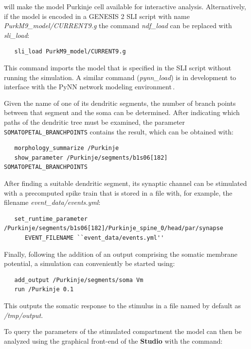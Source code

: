 \documentclass[12pt]{article}
\begin{document}
will make the model Purkinje cell available for interactive analysis.
Alternatively, if the model is encoded in a GENESIS 2 SLI script with
name {\it PurkM9\_model/CURRENT9.g} the command {\it ndf\_load} can be
replaced with {\it sli\_load}:

{\footnotesize
\begin{verbatim}
   sli_load PurkM9_model/CURRENT9.g
\end{verbatim}
}

This command imports the model that is specified in the SLI script
without running the simulation.  A similar command ({\it pynn\_load})
is in development to interface with the PyNN network modeling
environment\,\cite{andrew08:_pynn}.

Given the name of one of its dendritic segments, the number of branch
points between that segment and the soma can be determined. After
indicating which paths of the dendritic tree must be examined, the
parameter {\tt SOMATOPETAL\_BRANCHPOINTS} contains the result, which
can be obtained with:

{\footnotesize
\begin{verbatim}
   morphology_summarize /Purkinje
   show_parameter /Purkinje/segments/b1s06[182] SOMATOPETAL_BRANCHPOINTS
\end{verbatim}
}

After finding a suitable dendritic segment, its synaptic channel can
be stimulated with a precomputed spike train that is stored in a file
with, for example, the filename {\it event\_data/events.yml}:

{\footnotesize
\begin{verbatim}
   set_runtime_parameter /Purkinje/segments/b1s06[182]/Purkinje_spine_0/head/par/synapse
      EVENT_FILENAME ``event_data/events.yml''
\end{verbatim}
}

Finally, following the addition of an output comprising the somatic membrane potential, a simulation can conveniently be started using:

{\footnotesize
\begin{verbatim}
   add_output /Purkinje/segments/soma Vm
   run /Purkinje 0.1
\end{verbatim}
}

This outputs the somatic response to the stimulus in a file named by default as {\it /tmp/output}.

To query the parameters of the stimulated compartment the model can
then be analyzed using the graphical front-end of the {\bf Studio}
with the command:
\end{document}
